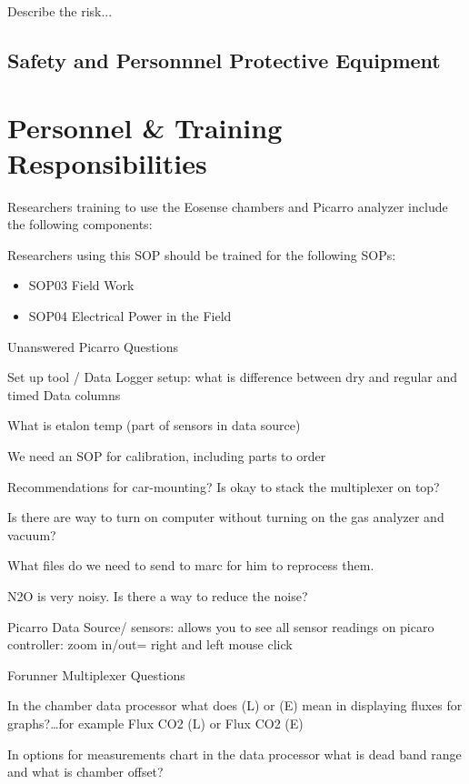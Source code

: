 \documentclass[12pt]{../SOP3}\usepackage[]{graphicx}\usepackage[]{color}
\begin{document}
\NP Describe the risk...


\subsection*{Safety and Personnnel Protective Equipment}


\section{Personnel \& Training Responsibilities}

Researchers training to use the Eosense chambers and Picarro analyzer include the following components: 



Researchers using this SOP should be trained for the following SOPs:

\begin{itemize}
  \item SOP03 Field Work
  \item SOP04 Electrical Power in the Field
\end{itemize}

Unanswered Picarro Questions

\NP Set up tool / Data Logger setup: what is difference between dry and regular and timed Data columns

\NP What is etalon temp (part of sensors in data source)

\NP We need an SOP for calibration, including parts to order

\NP Recommendations for car-mounting? Is okay to stack the multiplexer on top?

\NP Is there are way to turn on computer without turning on the gas analyzer and vacuum? 

\NP What files do we need to send to marc for him to reprocess them.

\NP N2O is very noisy. Is there a way to reduce the noise?

Picarro
Data Source/ sensors: allows you to see all sensor readings on picaro
controller: zoom in/out= right and left mouse click






Forunner Multiplexer Questions

\NP In the chamber data processor what does (L) or (E) mean in displaying fluxes for graphs?\ldots for example Flux CO2 (L) or Flux CO2 (E) 

\NP In options for measurements chart in the data processor what is dead band range and what is chamber offset? 
\end{document}
